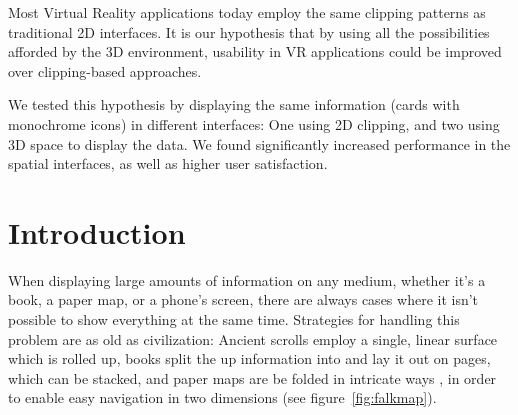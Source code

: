\documentclass{tufte-book} %
\begin{document}
Most Virtual Reality applications today employ the same clipping patterns as traditional 2D interfaces. It is our hypothesis that by using all the possibilities afforded by the 3D environment, usability in VR applications could be improved over clipping-based approaches.

We tested this hypothesis by displaying the same information (cards with monochrome icons) in different interfaces: One using 2D clipping, and two using 3D space to display the data. We found significantly increased performance in the spatial interfaces, as well as higher user satisfaction.




\chapter{Introduction} %

When displaying large amounts of information on any medium, whether it's a book, a paper map, or a phone's screen, there are always cases where it isn't possible to show everything at the same time. Strategies for handling this problem are as old as civilization: Ancient scrolls employ a single, linear surface which is rolled up, books split the up information into and lay it out on pages, which can be stacked, and paper maps are be folded in intricate ways \cite{angsusser2012map}, in order to enable easy navigation in two dimensions (see figure~\ref{fig:falkmap}).
\end{document}
